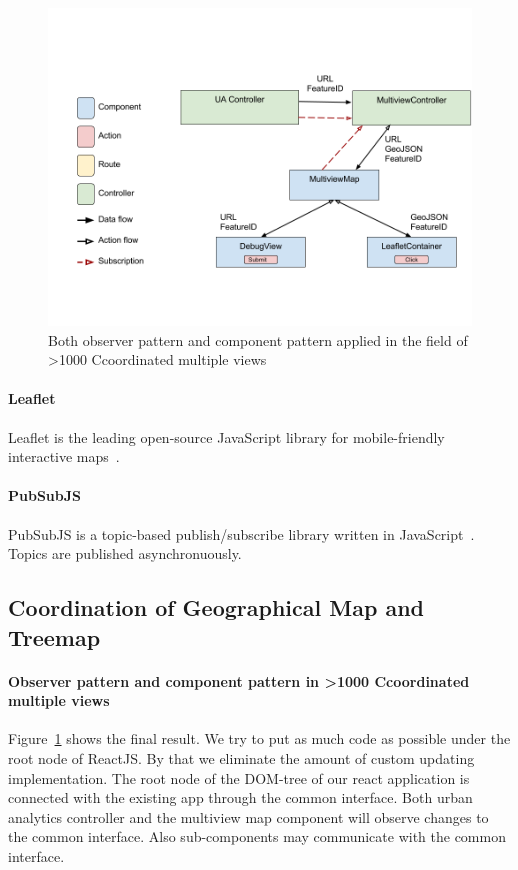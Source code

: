 \documentclass{article}
\newcommand\hmm[1]{\ifnum\ifhmode\spacefactor\else2000\fi>1000 \uppercase{#1}\else#1\fi}
\newcommand{\cmvs}{\hmm{c}oordinated multiple views}
\begin{document}
\begin{figure}[h!]
  \centering
  \includegraphics[width=\textwidth]{images/both-patterns-implemented.png}
  \caption{%
    Both observer pattern and component pattern applied in the field of \cmvs{}
  }\label{fig:implementation:both-patterns}
\end{figure}


\paragraph{Leaflet}
Leaflet is the leading open-source JavaScript library for mobile-friendly interactive maps~\cite{Leaflet2017}.

\paragraph{PubSubJS}
PubSubJS is a topic-based publish/subscribe library written in JavaScript~\cite{PubSubJS2017}.
Topics are published asynchronuously.

\subsection{Coordination of Geographical Map and Treemap}


\paragraph{Observer pattern and component pattern in \cmvs{}}
Figure~\ref{fig:implementation:both-patterns} shows the final result.
We try to put as much code as possible under the root node of ReactJS\@.
By that we eliminate the amount of custom updating implementation.
The root node of the DOM-tree of our react application is connected with the existing app through the common interface.
Both urban analytics controller and the multiview map component will observe changes to the common interface.
Also sub-components may communicate with the common interface.
\end{document}
